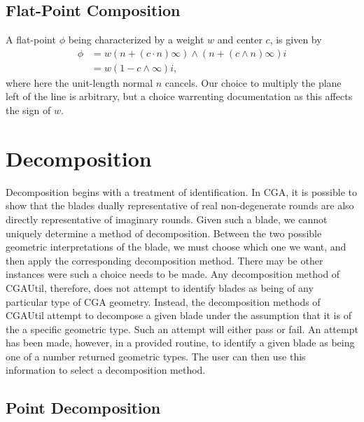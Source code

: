 \documentclass[12pt]{article}
\newcommand{\nvai}{\infty}
\begin{document}
\subsection{Flat-Point Composition}

A flat-point $\phi$ being characterized by a weight $w$ and center $c$, is given
by
\begin{align}\label{equ_flatpoint}
\phi &= w(n+(c\cdot n)\nvai)\wedge(n+(c\wedge n)\nvai)i \\
 &= w(1-c\wedge\nvai)i,
\end{align}
where here the unit-length normal $n$ cancels.  Our choice to multiply the plane
left of the line is arbitrary, but a choice warrenting documentation as this affects the sign of $w$.

\section{Decomposition}

Decomposition begins with a treatment of identification.  In CGA, it is possible
to show that the blades dually representative of real non-degenerate rounds are also
directly representative of imaginary rounds.  Given such a blade, we cannot
uniquely determine a method of decomposition.  Between the two possible
geometric interpretations of the blade, we must choose which one we want,
and then apply the corresponding decomposition method.
There may be other instances were such a
choice needs to be made.  Any decomposition method of CGAUtil, therefore, does not attempt to identify
blades as being of any particular type of CGA geometry.  Instead, the decomposition
methods of CGAUtil attempt to decompose a given blade under the assumption
that it is of the a specific geometric type.  Such an attempt will either pass or fail.
An attempt has been made, however, in a provided routine, to identify
a given blade as being one of a number returned geometric types.  The user
can then use this information to select a decomposition method.



\subsection{Point Decomposition}
\end{document}

